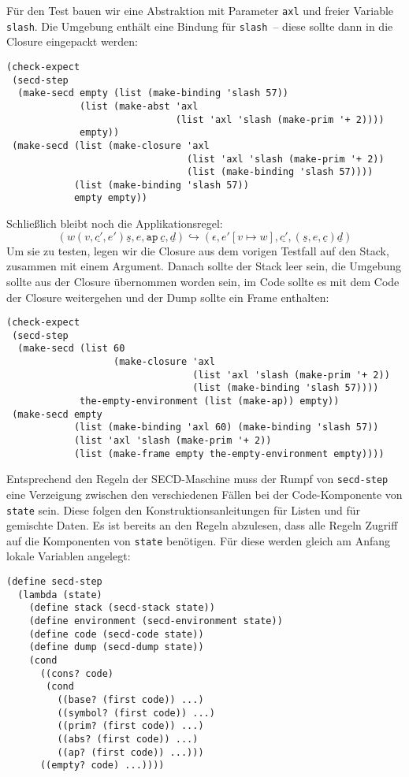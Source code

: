 %
Für den Test bauen wir eine Abstraktion mit Parameter \lstinline{axl}
und freier Variable \lstinline{slash}.  Die Umgebung enthält 
eine Bindung für \lstinline{slash}~-- diese sollte dann in die Closure
eingepackt werden:
%
\begin{lstlisting}
(check-expect
 (secd-step
  (make-secd empty (list (make-binding 'slash 57))
             (list (make-abst 'axl 
                              (list 'axl 'slash (make-prim '+ 2))))
             empty))
 (make-secd (list (make-closure 'axl
                                (list 'axl 'slash (make-prim '+ 2))
                                (list (make-binding 'slash 57))))
            (list (make-binding 'slash 57))
            empty empty))
\end{lstlisting}
%
Schließlich bleibt noch die Applikationsregel:
%
\begin{displaymath}
  (w (v,\underline{c'}, e') \underline{s}, e, \mathtt{ap}~\underline{c}, \underline{d})
  \hookrightarrow
  (\epsilon, e'[v\mapsto w], \underline{c'}, (\underline{s}, e, \underline{c}) \underline{d})
\end{displaymath}
%
Um sie zu testen, legen wir die Closure aus dem vorigen Testfall auf
den Stack, zusammen mit einem Argument.  Danach sollte der Stack leer
sein, die Umgebung sollte aus der Closure übernommen worden sein, im
Code sollte es mit dem Code der Closure weitergehen und der Dump
sollte ein Frame enthalten:
%
\begin{lstlisting}
(check-expect
 (secd-step
  (make-secd (list 60
                   (make-closure 'axl
                                 (list 'axl 'slash (make-prim '+ 2))
                                 (list (make-binding 'slash 57))))
             the-empty-environment (list (make-ap)) empty))
 (make-secd empty
            (list (make-binding 'axl 60) (make-binding 'slash 57))
            (list 'axl 'slash (make-prim '+ 2))
            (list (make-frame empty the-empty-environment empty))))
\end{lstlisting}
%
Entsprechend den Regeln der SECD-Maschine muss der Rumpf von
\lstinline{secd-step}
eine Verzeigung zwischen den verschiedenen Fällen bei der
Code-Komponente von \lstinline{state} sein.  Diese folgen den
Konstruktionsanleitungen für Listen und für gemischte Daten.  Es ist
bereits an den Regeln abzulesen, dass alle Regeln Zugriff auf die
Komponenten von \lstinline{state} benötigen.  Für diese werden gleich am
Anfang lokale Variablen angelegt:
%
\begin{lstlisting}
(define secd-step
  (lambda (state)
    (define stack (secd-stack state))
    (define environment (secd-environment state))
    (define code (secd-code state))
    (define dump (secd-dump state))
    (cond
      ((cons? code)
       (cond
         ((base? (first code)) ...)
         ((symbol? (first code)) ...)
         ((prim? (first code)) ...)
         ((abs? (first code)) ...)
         ((ap? (first code)) ...)))
      ((empty? code) ...))))
\end{lstlisting}
